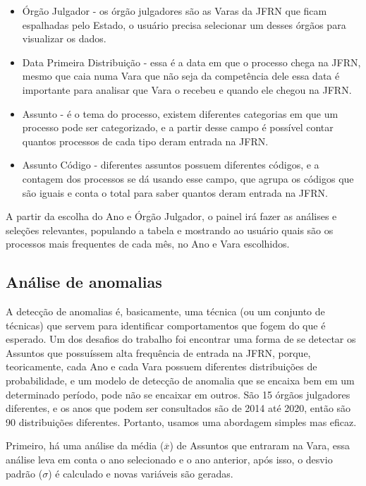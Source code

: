 \begin{itemize}
	\item Órgão Julgador - os órgão julgadores são as Varas da JFRN que ficam espalhadas pelo Estado, o usuário precisa selecionar um desses órgãos para visualizar os dados.
	
	\item Data Primeira Distribuição - essa é a data em que o processo chega na JFRN, mesmo que caia numa Vara que não seja da competência dele essa data é importante para analisar que Vara o recebeu e quando ele chegou na JFRN.
	
	\item Assunto - é o tema do processo, existem diferentes categorias em que um processo pode ser categorizado, e a partir desse campo é possível contar quantos processos de cada tipo deram entrada na JFRN.
	
	\item Assunto Código - diferentes assuntos possuem diferentes códigos, e a contagem dos processos se dá usando esse campo, que agrupa os códigos que são iguais e conta o total para saber quantos deram entrada na JFRN.
\end{itemize} 

A partir da escolha do Ano e Órgão Julgador, o painel irá fazer as análises e seleções relevantes, populando a tabela e mostrando ao usuário quais são os processos mais frequentes de cada mês, no Ano e Vara escolhidos.

\subsection{Análise de anomalias}

A detecção de anomalias é, basicamente, uma técnica (ou um conjunto de técnicas) que servem para identificar comportamentos que fogem do que é esperado. Um dos desafios do trabalho foi encontrar uma forma de se detectar os Assuntos que possuíssem alta frequência de entrada na JFRN, porque, teoricamente, cada Ano e cada Vara possuem diferentes distribuições de probabilidade, e um modelo de detecção de anomalia que se encaixa bem em um determinado período, pode não se encaixar em outros. São 15 órgãos julgadores diferentes, e os anos que podem ser consultados são de 2014 até 2020, então são 90 distribuições diferentes. Portanto, usamos uma abordagem simples mas eficaz.

Primeiro, há uma análise da média ($\overline{x}$) de Assuntos que entraram na Vara, essa análise leva em conta o ano selecionado e o ano anterior, após isso, o desvio padrão ($\sigma$) é calculado e novas variáveis são geradas.

